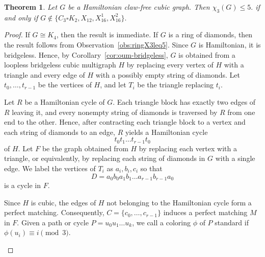 \documentclass[a4paper,11pt]{article}
\providecommand{\tikzsetnextfilename}[1]{}
\newtheorem{theorem}             {Theorem}
\theoremstyle{case}
\numberwithin{subcase}{case}
\begin{document}
\begin{theorem}\label{thm:ham-clawfree}
Let $G$ be a Hamiltonian claw-free cubic graph. 
Then
$
\chi_3(G)\leq5.
$
if and only if
$
G\notin\{C_3\square K_2,X_{12},X_{16}^{1},X_{16}^{2}\}.
$
\end{theorem}
\begin{proof}
If $G\cong K_4$, then the result is immediate. If $G$ is a ring of
diamonds, then the result follows from
Observation~\ref{obs:ringX3leq5}. Since $G$ is Hamiltonian, it is
bridgeless. Hence, by
Corollary~\ref{cor:oum-bridgeless}, $G$ is obtained from a loopless
bridgeless cubic multigraph $H$ by replacing every vertex of $H$ with
a triangle and every edge of $H$ with a possibly empty string of diamonds.
Let $t_0,\ldots,t_{r-1}$ be the vertices of $H$, and let $T_i$ be the
triangle replacing $t_i$.

Let $R$ be a Hamiltonian cycle of $G$. Each triangle block has exactly
two edges of $R$ leaving it, and every nonempty string of diamonds is
traversed by $R$ from one end to the other. Hence, after contracting
each triangle block to a vertex and each string of diamonds to an edge,
$R$ yields a Hamiltonian cycle
\[
t_0t_1\ldots t_{r-1}t_0
\]
of $H$.
Let $F$ be the graph obtained from $H$ by replacing each vertex with a
triangle, or equivalently, by replacing each string of diamonds in $G$
with a single edge. We label the vertices of $T_i$ as
$a_i,b_i,c_i$ so that
\[
D=a_0b_0a_1b_1\ldots a_{r-1}b_{r-1}a_0
\]
is a cycle in $F$.

Since $H$ is cubic, the edges of $H$ not belonging to the Hamiltonian
cycle form a perfect matching. Consequently,
$C=\{c_0,\ldots,c_{r-1}\}$ induces a perfect matching $M$ in $F$.
Given a path or cycle $P=u_0u_1\ldots u_k$, we call a coloring $\phi$
of $P$ standard if
$
\phi(u_i)\equiv i \pmod 3.
$

\begin{figure}[H]
    \centering


\tikzsetnextfilename{fig-cubic-standard}
\end{figure}
\end{proof}
\end{document}
